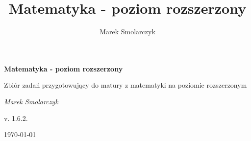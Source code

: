 \documentclass[a4paper,12pt]{book}
\begin{document}
\frontmatter

\begin{titlepage}
	\centering
	{ \bfseries \LARGE Matematyka - poziom rozszerzony \par }
	\vspace{1cm}
	{ \large Zbiór zadań przygotowujący do matury z matematyki na poziomie rozszerzonym \par }
	\vspace{3cm}
	{ \itshape \large Marek Smolarczyk \par }
	\vfill
	{ \large v. 1.6.2. \par }
	\vspace{0.2cm}
	{ \large \today \par }
\end{titlepage}

\author{Marek Smolarczyk}
\title{Matematyka - poziom rozszerzony}

\tableofcontents


\mainmatter



\backmatter
\end{document}
